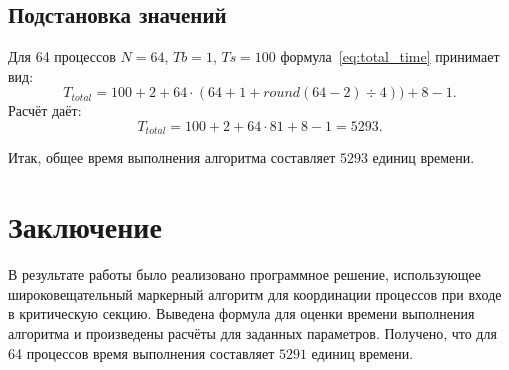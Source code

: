 \documentclass[openany, twoside, a4paper, 12pt]{extbook}
\begin{document}
\subsection*{Подстановка значений}
Для 64 процессов $N = 64$, $Tb = 1$, $Ts = 100$ формула~\ref{eq:total_time} принимает вид:
\[
	T_{total} = 100 + 2 + 64 \cdot (64 + 1 + round(64 - 2) \div 4) ) + 8 - 1.
\]
Расчёт даёт:
\[
T_{total} = 100 + 2 + 64 \cdot 81 + 8 - 1 = 5293.
\]

Итак, общее время выполнения алгоритма составляет $5293$ единиц времени.

\section*{Заключение}
В результате работы было реализовано программное решение,
использующее широковещательный маркерный алгоритм для координации процессов
при входе в критическую секцию. Выведена формула для оценки времени выполнения алгоритма и 
произведены расчёты для заданных параметров.
Получено, что для 64 процессов время выполнения составляет $5291$ единиц времени.
\end{document}
